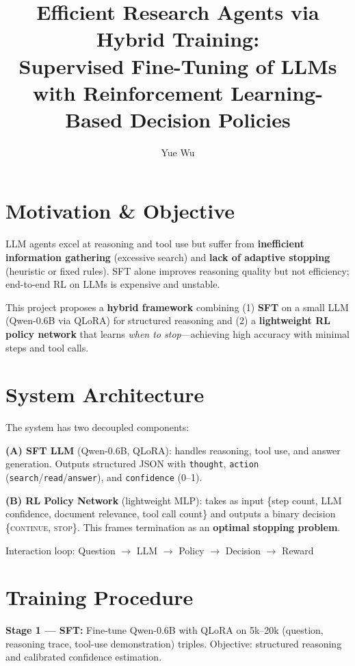 \documentclass[10pt]{article}
\title{\vspace{-2em}\textbf{Efficient Research Agents via Hybrid Training:\\
\large Supervised Fine-Tuning of LLMs with Reinforcement Learning-Based Decision Policies}\vspace{-1.2em}}
\author{Yue Wu}
\date{}
\begin{document}
\maketitle

\section*{Motivation \& Objective}

LLM agents excel at reasoning and tool use but suffer from \textbf{inefficient information gathering} (excessive search) and \textbf{lack of adaptive stopping} (heuristic or fixed rules). SFT alone improves reasoning quality but not efficiency; end-to-end RL on LLMs is expensive and unstable.

This project proposes a \textbf{hybrid framework} combining (1) \textbf{SFT} on a small LLM (Qwen-0.6B via QLoRA) for structured reasoning and (2) a \textbf{lightweight RL policy network} that learns \emph{when to stop}---achieving high accuracy with minimal steps and tool calls.

\section*{System Architecture}

The system has two decoupled components:

\textbf{(A) SFT LLM} (Qwen-0.6B, QLoRA): handles reasoning, tool use, and answer generation. Outputs structured JSON with \texttt{thought}, \texttt{action} (\texttt{search}/\texttt{read}/\texttt{answer}), and \texttt{confidence} (0--1).

\textbf{(B) RL Policy Network} (lightweight MLP): takes as input \{step count, LLM confidence, document relevance, tool call count\} and outputs a binary decision \{\textsc{continue}, \textsc{stop}\}. This frames termination as an \textbf{optimal stopping problem}.

Interaction loop: \quad Question $\to$ LLM $\to$ Policy $\to$ Decision $\to$ Reward

\section*{Training Procedure}

\textbf{Stage 1 --- SFT:} Fine-tune Qwen-0.6B with QLoRA on 5k--20k (question, reasoning trace, tool-use demonstration) triples. Objective: structured reasoning and calibrated confidence estimation.
\end{document}
